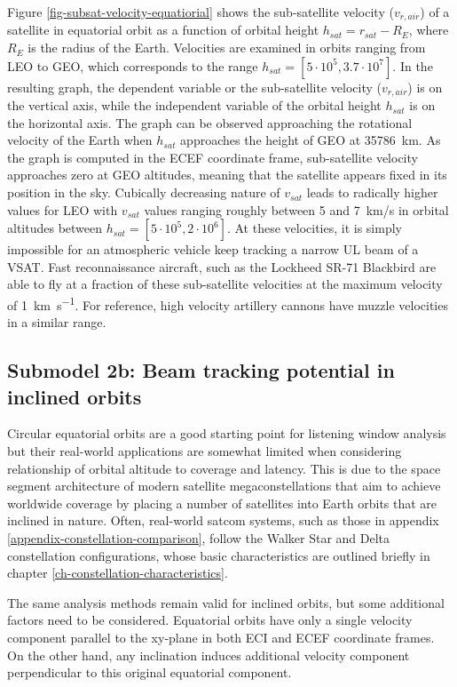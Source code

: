 \documentclass[english, 12pt, a4paper, elec, utf8, a-1b, online]{aaltothesis}
\begin{document}
Figure \ref{fig-subsat-velocity-equatiorial} shows the sub-satellite velocity ($v_{r, air}$) of a satellite in equatorial orbit as a function of orbital height $h_{sat} = r_{sat} - R_{E}$, where $R_{E}$ is the radius of the Earth.
Velocities are examined in orbits ranging from LEO to GEO, which corresponds to the range $h_{sat} = [5 \cdot 10^5, 3.7 \cdot 10^7]$.
In the resulting graph, the dependent variable or the sub-satellite velocity ($v_{r, air}$) is on the vertical axis, while the independent variable of the orbital height $h_{sat}$ is on the horizontal axis.
The graph can be observed approaching the rotational velocity of the Earth when $h_{sat}$ approaches the height of GEO at \SI{35786}{\kilo\meter}.
As the graph is computed in the ECEF coordinate frame, sub-satellite velocity approaches zero at GEO altitudes, meaning that the satellite appears fixed in its position in the sky.
Cubically decreasing nature of $v_{sat}$ leads to radically higher values for LEO with $v_{sat}$ values ranging roughly between 5 and 7\ km/s in orbital altitudes between $h_{sat} = [5 \cdot 10^5, 2 \cdot 10^6]$.
At these velocities, it is simply impossible for an atmospheric vehicle keep tracking a narrow UL beam of a VSAT.
Fast reconnaissance aircraft, such as the Lockheed SR-71 Blackbird are able to fly at a fraction of these sub-satellite velocities at the maximum velocity of \SI{1}{\kilo\meter\per\second}.
For reference, high velocity artillery cannons have muzzle velocities in a similar range.

\subsection{Submodel 2b: Beam tracking potential in inclined orbits} \label{ch-results-submodel-2b-tracking-inclined}

Circular equatorial orbits are a good starting point for listening window analysis but their real-world applications are somewhat limited when considering relationship of orbital altitude to coverage and latency.
This is due to the space segment architecture of modern satellite megaconstellations that aim to achieve worldwide coverage by placing a number of satellites into Earth orbits that are inclined in nature.
Often, real-world satcom systems, such as those in appendix \ref{appendix-constellation-comparison}, follow the Walker Star and Delta constellation configurations, whose basic characteristics are outlined briefly in chapter \ref{ch-constellation-characteristics}.

The same analysis methods remain valid for inclined orbits, but some additional factors need to be considered.
Equatorial orbits have only a single velocity component parallel to the xy-plane in both ECI and ECEF coordinate frames.
On the other hand, any inclination induces additional velocity component perpendicular to this original equatorial component.
\end{document}

